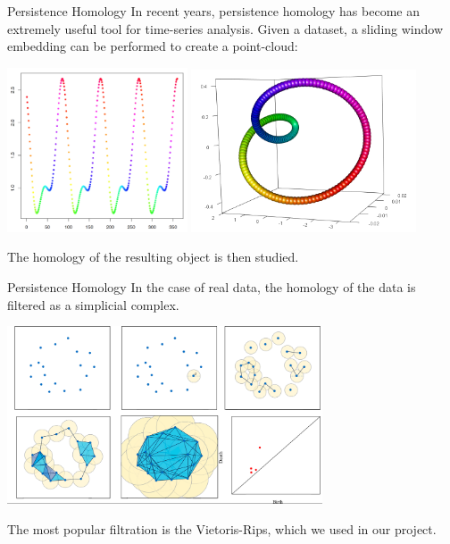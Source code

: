 \documentclass[14pt,aspectratio=169, serif, dvipsnames]{beamer}
\begin{document}
\begin{frame}{Persistence Homology}
    In recent years, persistence homology has become an extremely useful tool for time-series analysis. Given a dataset, a sliding window embedding can be performed to create a point-cloud:
    
    \begin{center}
        \includegraphics[width =         0.4\textwidth]{pictures/TimeSeries.png}
        \includegraphics[width = 0.5\textwidth]{pictures/pointcloud.png}
    \end{center}
    
    The homology of the resulting object is then studied.
\end{frame}

\begin{frame}{Persistence Homology}
    In the case of real data, the homology of the data is filtered as a simplicial complex.
    
    \begin{center}
        \includegraphics[width = 0.7\textwidth]{pictures/filtration.png}
    \end{center}
    
    The most popular filtration is the Vietoris-Rips, which we used in our project.
\end{frame}
\end{document}
